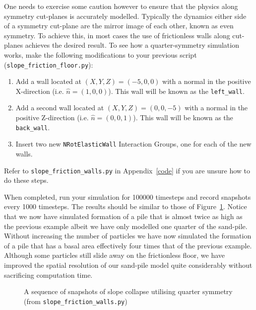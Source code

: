 One needs to exercise some caution however to ensure that the physics along symmetry cut-planes is accurately modelled. Typically the dynamics either side of a symmetry cut-plane are the mirror image of each other, known as even symmetry. To achieve this, in most cases the use of frictionless walls along cut-planes achieves the desired result. To see how a quarter-symmetry simulation works, make the following modifications to your previous script (\texttt{slope\_friction\_floor.py}):

\begin{enumerate}
\item Add a wall located at $(X,Y,Z) = (-5,0,0)$ with a normal in the positive X-direction (i.e. $\hat{n} = (1,0,0)$). This wall will be known as the \texttt{left\_wall}. 
\item Add a second wall located at $(X,Y,Z) = (0,0,-5)$ with a normal in the positive Z-direction (i.e. $\hat{n} = (0,0,1)$). This wall will be known as the \texttt{back\_wall}. 
\item Insert two new \texttt{NRotElasticWall} Interaction Groups, one for each of the new walls.
\end{enumerate}

\noindent
Refer to \texttt{slope\_friction\_walls.py} in Appendix~\ref{code} if you are unsure how to do these steps. 

When completed, run your simulation for 100000 timesteps and record snapshots every 1000 timesteps. The results should be similar to those of Figure~\ref{fig:slope_friction_walls_pics}. Notice that we now have simulated formation of a pile that is almost twice as high as the previous example albeit we have only modelled one quarter of the sand-pile. Without increasing the number of particles we have now simulated the formation of a pile that has a basal area effectively four times that of the previous example. Although some particles still slide away on the frictionless floor, we have improved the spatial resolution of our sand-pile model quite considerably without sacrificing computation time. 

\begin{figure}
\caption{A sequence of snapshots of slope collapse utilising quarter symmetry (from \texttt{slope\_friction\_walls.py})} \label{fig:slope_friction_walls_pics}
\end{figure}

